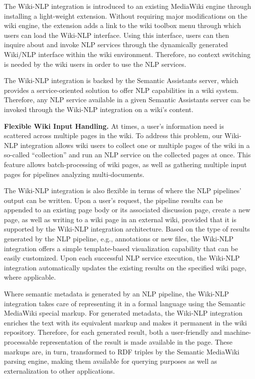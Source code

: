 \begin{description}
\item[Light-weight MediaWiki Extension.] The Wiki-NLP integration is introduced to an existing MediaWiki engine through installing a light-weight extension. Without requiring major modifications on the wiki engine, the extension adds a link to the wiki toolbox menu through which users can load the Wiki-NLP interface. Using this interface, users can then inquire about and invoke NLP services through the dynamically generated Wiki/NLP interface within the wiki environment. Therefore, no context switching is needed by the wiki users in order to use the NLP services.
\item[NLP pipeline Independent Architecture.] The Wiki-NLP integration is backed by the Semantic Assistants server, which provides a service-oriented solution to offer NLP capabilities in a wiki system. Therefore, any NLP service available in a given Semantic Assistants server can be invoked through the Wiki-NLP integration on a wiki's content.
\item\textbf{Flexible Wiki Input Handling.} At times, a user's information need is scattered across multiple pages in the wiki. To address this problem, our Wiki-NLP integration allows wiki users to collect one or multiple pages of the wiki in a so-called ``collection'' and run an NLP service on the collected pages at once. This feature allows batch-processing of wiki pages, as well as gathering multiple input pages for pipelines analyzing multi-documents.
\item[Flexible NLP Result Handling.] The Wiki-NLP integration is also flexible in terms of where the NLP pipelines' output can be written. Upon a user's request, the pipeline results can be appended to an existing page body or its associated discussion page, create a new page, as well as writing to a wiki page in an external wiki, provided that it is supported by the Wiki-NLP integration architecture. Based on the type of results generated by the NLP pipeline, e.g., annotations or new files, the Wiki-NLP integration offers a simple template-based visualization capability that can be easily customized. Upon each successful NLP service execution, the Wiki-NLP integration automatically updates the existing results on the specified wiki page, where applicable.
\item[Semantic Markup Generation.] Where semantic metadata is generated by an NLP pipeline, the Wiki-NLP integration takes care of representing it in a formal language using the Semantic MediaWiki special markup. For generated metadata, the Wiki-NLP integration enriches the text with its equivalent markup and makes it permanent in the wiki repository. Therefore, for each generated result, both a user-friendly and machine-processable representation of the result is made available in the page. These markups are, in turn, transformed to RDF triples by the Semantic MediaWiki parsing engine, making them available for querying purposes as well as externalization to other applications.


\end{description}
